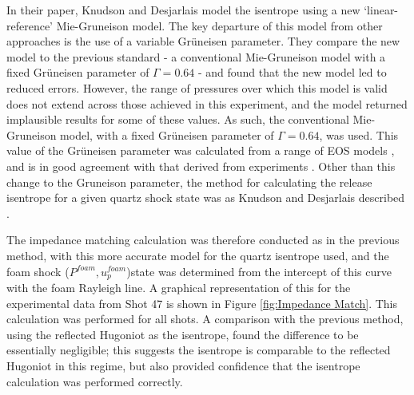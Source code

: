 In their paper, Knudson and Desjarlais model the isentrope using a new `linear-reference' Mie-Gruneison model. The key departure of this model from other approaches is the use of a variable Gr{\"u}neisen parameter. They compare the new model to the previous standard - a conventional Mie-Gruneison model with a fixed Gr{\"u}neisen parameter of $\Gamma = 0.64$ - and found that the new model led to reduced errors. However, the range of pressures over which this model is valid does not extend across those achieved in this experiment, and the model  returned implausible results for some of these values. As such, the conventional Mie-Gruneison model, with a fixed Gr{\"u}neisen parameter of $\Gamma = 0.64$, was used. This value of the Gr{\"u}neisen parameter was calculated from a range of EOS models \cite{Hicks2008}, and is in good agreement with that derived \cite{Hicks2008} from experiments \cite{Hicks2005, Trunin1994}. Other than this change to the Gruneison parameter, the method for calculating the release isentrope for a given quartz shock state was as Knudson and Desjarlais described \cite{Knudson2013}.

The impedance matching calculation was therefore conducted as in the previous method, with this more accurate model for the quartz isentrope used, and the foam shock ($P^{foam}, u_p^{foam}$)state was determined from the intercept of this curve with the foam Rayleigh line. A graphical representation of this for the experimental data from Shot 47 is shown in Figure \ref{fig:Impedance Match}. This calculation was performed for all shots. A comparison with the previous method, using the reflected Hugoniot as the isentrope, found the difference to be essentially negligible; this suggests the isentrope is comparable to the reflected Hugoniot in this regime, but also provided confidence that the isentrope calculation was performed correctly. 



